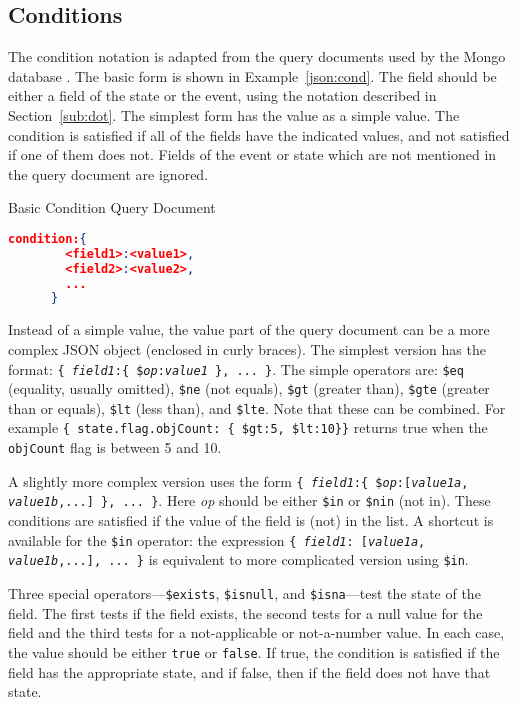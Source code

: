 \documentclass{article}
\begin{document}
  \subsection{Conditions}
  \label{sub:cond}

  The condition notation is adapted from the query documents used by
  the Mongo database \cite{mongo}.  The basic form is shown in
  Example~\ref{json:cond}.  The field should be
  either a field of the state or the event, using the notation
  described in Section~\ref{sub:dot}.  The simplest form has the value
  as a simple value.  The condition is satisfied if all of the fields
  have the indicated values, and not satisfied if one of them does
  not.  Fields of the event or state which are not mentioned in the
  query document are ignored.

  \begin{algorithm}
    \caption{Basic Condition Query Document}
    \label{json:cond}
    \begin{lstlisting}[language=json]
      condition:{
        <field1>:<value1>,
        <field2>:<value2>,
        ...
      }
    \end{lstlisting}
  \end{algorithm}

  Instead of a simple value, the value part of the query document can
  be a more complex JSON object (enclosed in curly braces).  The
  simplest version has the format:  \texttt{\{ \textit{field1}:\{
    \$\textit{op}:\textit{value1} \}, ... \}}.  The simple operators
  are: \texttt{\$eq} (equality, usually omitted), \texttt{\$ne} (not
  equals), \texttt{\$gt} (greater than), \texttt{\$gte} (greater than
  or equals), \texttt{\$lt} (less than), and \texttt{\$lte}.  Note
  that these can be combined.  For example
  \verb|{ state.flag.objCount: { $gt:5, $lt:10}}| returns true when
  the \texttt{objCount} flag is between 5 and 10.

  A slightly more complex version uses the form \texttt{\{ \textit{field1}:\{
    \$\textit{op}:[\textit{value1a}, \textit{value1b},...] \},
    ... \}}.  Here \textit{op} should be either \texttt{\$in} or
  \texttt{\$nin} (not in).  These conditions are satisfied if the
  value of the field is (not) in the list.  A shortcut is available
  for the \texttt{\$in} operator:  the expression \texttt{\{
    \textit{field1}: [\textit{value1a}, \textit{value1b},...], ... \}}
  is equivalent to more complicated version using \texttt{\$in}.

  Three special operators---\texttt{\$exists}, \texttt{\$isnull}, and
  \texttt{\$isna}---test the state of the field.  The first tests if
  the field exists, the second tests for a null value for the field
  and the third tests for a not-applicable or not-a-number value.  In
  each case, the value should be either \texttt{true} or
  \texttt{false}.  If true, the condition is satisfied if the field
  has the appropriate state, and if false, then if the field does not
  have that state.
\end{document}

